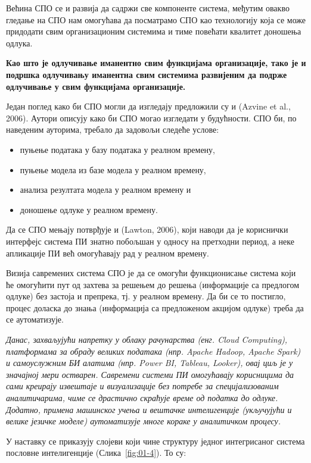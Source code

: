 Већина СПО се и развија да садржи све компоненте система, међутим овакво гледање на СПО нам омогућава да посматрамо СПО као технологију која се може придодати свим организационим системима и тиме повећати квалитет доношења одлука.

\textbf{Као што је одлучивање иманентно свим функцијама организације, тако је и подршка одлучивању иманентна свим системима развијеним да подрже одлучивање у свим функцијама организације.}

Један поглед како би СПО могли да изгледају предложили су и (Azvine et al., 2006). Аутори описују како би СПО могао изгледати у будућности. СПО би, по наведеним ауторима, требало да задовољи следеће услове:

\begin{itemize}
  \item пуњење података у базу података у реалном времену,
  \item пуњење модела из базе модела у реалном времену,
  \item анализа резултата модела у реалном времену и
  \item доношење одлуке у реалном времену.
\end{itemize}
Да се СПО мењају потврђује и (Lawton, 2006), који наводи да је кориснички интерфејс система ПИ знатно побољшан у односу на претходни период, а неке апликације ПИ већ омогућавају рад у реалном времену.

Визија савремених система СПО је да се омогући функционисање система који ће омогућити пут од захтева за решењем до решења (информације са предлогом одлуке) без застоја и препрека, тј. у реалном времену. Да би се то постигло, процес доласка до знања (информација са предложеном акцијом одлуке) треба да се аутоматизује.

\textit{Данас, захваљујући напретку у облаку рачунарства (енг. Cloud Computing), платформама за обраду великих података (нпр. Apache Hadoop, Apache Spark) и самоуслужним БИ алатима (нпр. Power BI, Tableau, Looker), овај циљ је у значајној мери остварен. Савремени системи ПИ омогућавају корисницима да сами креирају извештаје и визуализације без потребе за специјализованим аналитичарима, чиме се драстично скраћује време од податка до одлуке. Додатно, примена машинског учења и вештачке интелигенције (укључујући и велике језичке моделе) аутоматизује многе кораке у аналитичком процесу.}

У наставку се приказују слојеви који чине структуру једног интегрисаног система пословне интелигенције (Слика~\ref{fig:01-4}). То су:

